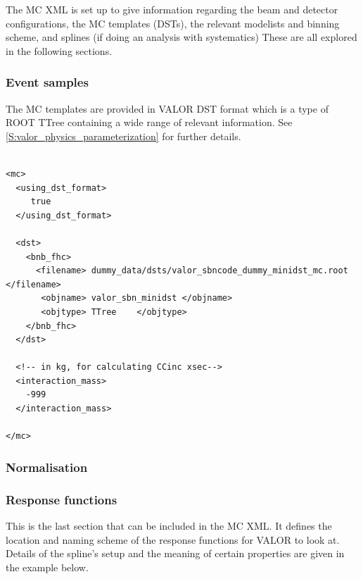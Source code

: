 The MC XML is set up to give information regarding the beam and detector configurations, the MC templates (DSTs), the relevant modelists and binning scheme, and splines (if doing an analysis with systematics) These are all explored in the following sections.

\subsubsection{Event samples}

The MC templates are provided in VALOR DST format which is a type of ROOT TTree containing a wide range of relevant information. See \ref{S:valor_physics_parameterization} for further details.

{\color{capri}
\begin{verbatim}

<mc>
  <using_dst_format> 
     true 
  </using_dst_format> 

  <dst> 
    <bnb_fhc>
      <filename> dummy_data/dsts/valor_sbncode_dummy_minidst_mc.root </filename>
       <objname> valor_sbn_minidst </objname> 
       <objtype> TTree    </objtype> 
    </bnb_fhc>
  </dst>
  
  <!-- in kg, for calculating CCinc xsec-->
  <interaction_mass> 
    -999 
  </interaction_mass>

</mc>

\end{verbatim}
}

\subsubsection{Normalisation}

\subsubsection{Response functions}

This is the last section that can be included in the MC XML. It defines the location and naming scheme of the response functions for VALOR to look at. Details of the spline's setup and the meaning of certain properties are given in the example below.

